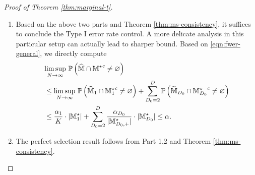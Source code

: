 \documentclass[12pt]{article}
\begin{document}
\begin{proof}[Proof of Theorem \ref{thm:marginal-t}]
\begin{enumerate}
    For simplicity, let
    \begin{align*}
        Z_d^\star = \Phi^{-1}\lt(1-\frac{\alpha_d}{2|\bbM^{\star }_{d,+}|} \rt). 
    \end{align*}
    Then
    \begin{align}
        &\underset{N\to\infty}{\lim\sup}~\bbP\lt\{\tilde{\bbM}^c_{d}\cap\bbM^{\star }_k\neq \varnothing\rt\} \notag\\
        &\le \underset{N\to\infty}{\lim\sup}~ \sum_{\cK\in\bbM^{\star }_{d}} \lt(\bbP\lt\{-Z_d^\star - \frac{\tau_\cK}{\sigma_\cK}\le\frac{\htau_{\cK}}{ {\sigma}_\cK} - \frac{\tau_\cK}{\sigma_\cK}\le Z_d^\star - \frac{\tau_\cK}{\sigma_\cK}\rt\} + \frac{\tilde{C}}{(QN_0)^{1/3}}\rt)\notag\\
        & = \underset{N\to\infty}{\lim\sup}~\sum_{\cK\in\bbM_d^\star} \Phi\lt\{r_\cK^{-1}\lt(Z_d^\star - \frac{\tau_\cK}{\sigma_\cK}\rt)\rt\} - \Phi\lt\{r_\cK^{-1}\lt(-Z_d^\star - \frac{\tau_\cK}{\sigma_\cK}\rt)\rt\}.\label{eqn:typeII-limit}
    \end{align}
    
     With Condition \ref{cond:order}, we have
    \begin{align*}
        Z_d^\star =  \Theta\lt(\sqrt{2\ln\frac{2|\bbM_{d,+}^\star|}{\alpha_d}}\rt) =  \Theta(\max\{\sqrt{\delta'\ln N},\sqrt{\ln(2|\bbM^\star_{d,+}|)}\}),~ \lt|\frac{\tau_\cK}{\sigma_\cK}\rt| =  \Theta(N^{1/2+\delta}).
    \end{align*}
    Because $\delta>-1/2$ and $\delta'\ge 0$, we have $|\frac{\tau_\cK}{\sigma_\cK}| \to \infty$ and $Z_d^\star/(|\frac{\tau_\cK}{\sigma_\cK}|) \to 0$. Hence the above limit \eqref{eqn:typeII-limit} converges to zero. This concludes the proof.
    
    \item Based on the above two parts and Theorem \ref{thm:ms-consistency}, it suffices to conclude the Type I error rate control. A more delicate analysis in this particular setup can actually lead to sharper bound. Based on \eqref{eqn:fwer-general}, we directly compute
    \begin{align*}
    &\underset{N \to\infty}{\lim\sup}~{\mathbb{P}}\left(\widehat{{\mathbb{M}}}\cap{{\mathbb{M}}^\star}^c\neq \varnothing\right) \\
    &\le\underset{N \to\infty}{\lim\sup}~{\mathbb{P}}\left(\widehat{{\mathbb{M}}}_1\cap{{\mathbb{M}}_1^\star}^c\neq\varnothing\right) + \sum_{D_0=2}^D {\mathbb{P}}\left(  \widetilde{{\mathbb{M}}}_{D_0}\cap{{\mathbb{M}}_{D_0}^\star}^c\neq\varnothing\right)\\
    &\le 
    \frac{\alpha_1}{K}\cdot|{\mathbb{M}}_1^\star| + \sum_{D_0=2}^D \frac{\alpha_{D_0}}{|{\mathbb{M}}^\star_{D_0,+}|}\cdot|{\mathbb{M}}^\star_{D_0}| \le \alpha. 
    \end{align*}
    
    \item The perfect selection result follows from Part 1,2 and Theorem \ref{thm:ms-consistency}.

\end{enumerate}
 
\end{proof}
\end{document}
